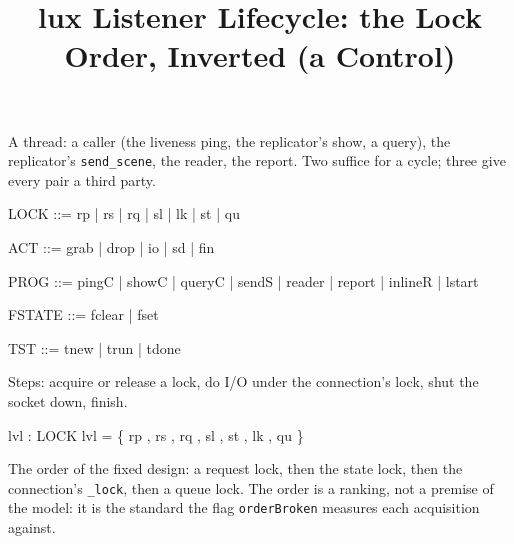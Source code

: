 \documentclass[a4paper,10pt,fleqn]{article}
\begin{document}
\title{lux Listener Lifecycle: the Lock Order, Inverted (a Control)}
\maketitle

\begin{zed}
  [T]
\end{zed}

A thread: a caller (the liveness ping, the replicator's show, a query), the
replicator's \texttt{send\_scene}, the reader, the report.  Two suffice for a
cycle; three give every pair a third party.

\begin{zed}
  LOCK ::= rp | rs | rq | sl | lk | st | qu
\end{zed}

\begin{zed}
  ACT ::= grab | drop | io | sd | fin
\end{zed}

\begin{zed}
  PROG ::= pingC | showC | queryC | sendS | reader | report | inlineR | lstart
\end{zed}

\begin{zed}
  FSTATE ::= fclear | fset
\end{zed}

\begin{zed}
  TST ::= tnew | trun | tdone
\end{zed}

Steps: acquire or release a lock, do I/O under the connection's lock, shut the
socket down, finish.

\begin{axdef}
  lvl : LOCK  
\where
  lvl = \{ rp , rs , rq , sl ,
    st , lk , qu  \}
\end{axdef}

The order of the fixed design: a request lock, then the state lock, then the
connection's \texttt{\_lock}, then a queue lock.  The order is a ranking, not
a premise of the model: it is the standard the flag \texttt{orderBroken}
measures each acquisition against.
\end{document}
